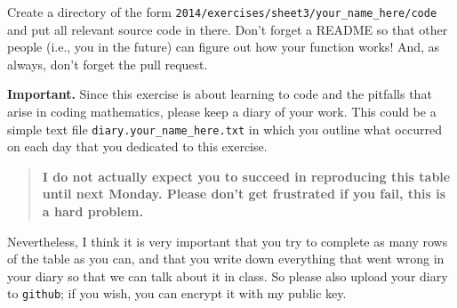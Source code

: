 \documentclass[11pt]{amsart}
\begin{document}
\begin{enumerate}
\bigskip Create a directory of the form
\texttt{2014/exercises/sheet3/your\_name\_here/code} and put all
relevant source code in there. Don't forget a README so that other
people (i.e., you in the future) can figure out how your function
works! And, as always, don't forget the pull request.

\bigskip
\textbf{Important.} Since this exercise is about learning to code and the pitfalls that arise in coding mathematics, please keep a diary of your work. This could be a simple text file \texttt{diary.your\_name\_here.txt} in which you outline what occurred on each day that you dedicated to this exercise.

\begin{quote}
  \textbf{I do not actually expect you to succeed in reproducing this     table until next Monday. Please don't get frustrated if you fail, this is a hard problem.}
\end{quote}

Nevertheless, I think it is very important that you try to complete as many rows of the table as you can, and that you write down everything that went wrong in your diary so that we can talk about it in class. So please also upload your diary to \texttt{github}; if you wish, you can encrypt it with my public key.

\end{enumerate}
\end{document}
